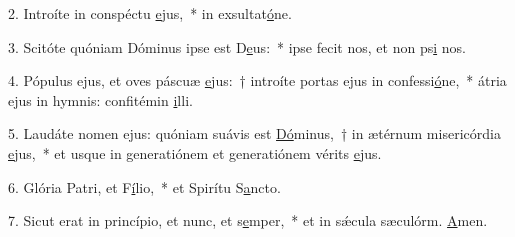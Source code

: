 2. Introíte in conspéctu \uline{e}jus,~* in exsultat\uline{ó}ne.\par 
3. Scitóte quóniam Dóminus ipse est D\uline{e}us:~* ipse fecit nos, et non ps\uline{i} nos.\par 
4. Pópulus ejus, et oves páscuæ \uline{e}jus:~† introíte portas ejus in confessi\uline{ó}ne,~* átria ejus in hymnis: confitémin \uline{i}lli.\par 
5. Laudáte nomen ejus: quóniam suávis est \uline{Dó}minus,~† in ætérnum misericórdia \uline{e}jus,~* et usque in generatiónem et generatiónem vérits \uline{e}jus.\par 
6. Glória Patri, et F\uline{í}lio,~* et Spirítu S\uline{a}ncto.\par 
7. Sicut erat in princípio, et nunc, et s\uline{e}mper,~* et in sǽcula sæculórm. \uline{A}men.\par 
